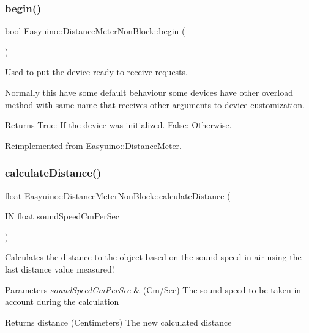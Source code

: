 \subsubsection{\texorpdfstring{begin()}{begin()}}
{\footnotesize\ttfamily bool Easyuino\+::\+Distance\+Meter\+Non\+Block\+::begin (\begin{DoxyParamCaption}{ }\end{DoxyParamCaption})\hspace{0.3cm}{\ttfamily [virtual]}}



Used to put the device ready to receive requests. 

Normally this have some default behaviour some devices have other overload method with same name that receives other arguments to device customization. \begin{DoxyReturn}{Returns}
True\+: If the device was initialized. False\+: Otherwise. 
\end{DoxyReturn}


Reimplemented from \hyperlink{class_easyuino_1_1_distance_meter_a0374e6f806cd71f0f918c6ea7b7700a0}{Easyuino\+::\+Distance\+Meter}.

\mbox{\label{class_easyuino_1_1_distance_meter_non_block_aa51eb173540f65e000189ac7137e699a}} 
\subsubsection{\texorpdfstring{calculate\+Distance()}{calculateDistance()}}
{\footnotesize\ttfamily float Easyuino\+::\+Distance\+Meter\+Non\+Block\+::calculate\+Distance (\begin{DoxyParamCaption}\item[{IN float}]{sound\+Speed\+Cm\+Per\+Sec }\end{DoxyParamCaption})\hspace{0.3cm}{\ttfamily [protected]}}



Calculates the distance to the object based on the sound speed in air using the last distance value measured! 


\begin{DoxyParams}{Parameters}
{\em sound\+Speed\+Cm\+Per\+Sec} & (Cm/\+Sec) The sound speed to be taken in account during the calculation \\
\hline
\end{DoxyParams}
\begin{DoxyReturn}{Returns}
distance (Centimeters) The new calculated distance 
\end{DoxyReturn}
\mbox{\label{class_easyuino_1_1_distance_meter_non_block_a845d4db657ff408205d1cdb3c35982a4}} 
